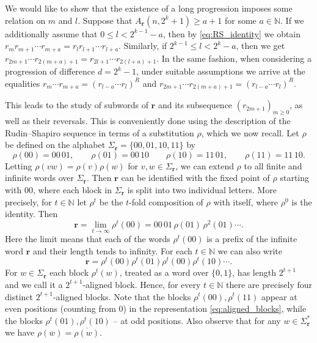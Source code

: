 \documentclass[a4paper,11pt]{amsart}
\theoremstyle{definition}
\newcommand{\N}{\mathbb{N}}
\begin{document}
We would like to show that the existence of a long progression imposes some relation on $m$ and $l$. Suppose that $A_{\mathbf{r}}(n,2^k+1) \geq a + 1$  for some $a \in \N$. If we additionally assume that $0 \leq l < 2^{k-1}-a$, then by \eqref{eq:RS_identity} we obtain  $r_m r_{m+1}\cdots r_{m+a}=r_l r_{l+1}\cdots r_{l+a}$. Similarly, if $2^{k-1} \leq l < 2^{k}-a$, then we get $r_{2m+1} \cdots r_{2(m+a)+1} =r_{2l+1} \cdots r_{2(l+a)+1}$.  In the same fashion, when considering a progression of difference $d=2^k-1$, under suitable assumptions we arrive at the equalities $r_{m}\cdots r_{m+a}=(r_{l-a} \cdots r_l)^R$ and $r_{2m+1} \cdots r_{2(m+a)+1}=(r_{l-a} \cdots r_l)^R$.

This leads to the study of subwords of $\mathbf{r}$ and its subsequence $(r_{2m+1})_{m \geq 0}$, as well as their reversals.  This is conveniently done using the description of the Rudin--Shapiro sequence in terms of a substitution $\rho$, which we now recall. Let $\rho$ be defined on the alphabet $\Sigma_{\mathbf{r}} = \{00,01,10,11\}$ by
$$ \rho(00)=00 \, 01, \qquad \rho(01)=00 \,10 \qquad \rho(10)=11 \, 01, \qquad \rho(11)=11 \, 10.$$
Letting $\rho(vw) = \rho(v)\rho(w)$ for $v,w \in \Sigma_{\mathbf{r}}$, we can extend $\rho$ to all finite and infinite words over $\Sigma_{\mathbf{r}}$. Then $\mathbf{r}$ can be identified with the fixed point of $\rho$ starting with $00$, where each block in $\Sigma_{\mathbf{r}}$ is split into two individual letters. More precisely, for $t \in \N$ let $\rho^t$ be the $t$-fold composition of $\rho$ with itself, where $\rho^{0}$ is the identity. Then
$$ \mathbf{r} = \lim_{t \to \infty} \rho^t(00) = 00 \, 01 \, \rho(01) \, \rho^2(01) \cdots. $$
Here the limit means that each of the words $\rho^t(00)$ is a prefix of the infinite word $\mathbf{r}$ and their length tends to infinity. For each $t \in \N$ we can also write
\begin{equation} \label{eq:aligned_blocks}
\mathbf{r} = \rho^t(00) \rho^t(01) \rho^t(00) \rho^t(10) \cdots.
\end{equation}
For $w \in \Sigma_{\mathbf{r}}$ each block $\rho^t(w)$, treated as a word over $\{0,1\}$, has length $2^{t+1}$ and we call it a $2^{t+1}$-aligned block. Hence, for every $t \in \N$ there are precisely four distinct $2^{t+1}$-aligned blocks. Note that the blocks $\rho^t(00),\rho^t(11)$ appear at even positions (counting from $0$) in the representation \eqref{eq:aligned_blocks}, while the blocks $\rho^t(01),\rho^t(10)$ -- at odd positions. Also observe that for any $w \in \Sigma_{\mathbf{r}}^*$ we have $\rho(\overline{w}) = \overline{\rho(w)}$.
\end{document}
